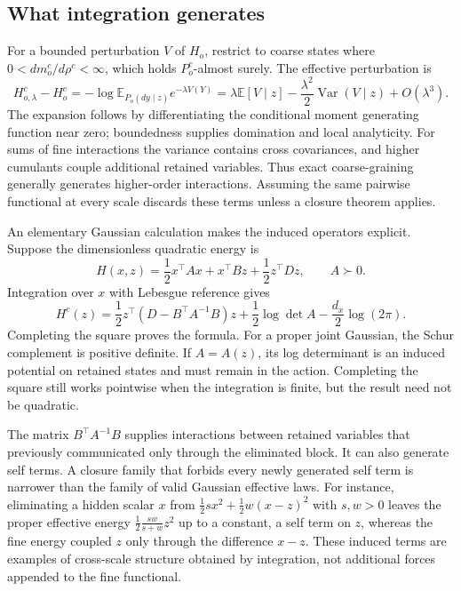 \subsection{What integration generates}
For a bounded perturbation $V$ of $H_o$, restrict to coarse states where $0<dm_o^c/d\rho^c<\infty$, which holds $P_o^c$-almost surely. The effective perturbation is
\begin{equation}
H_{o,\lambda}^c-H_o^c
=-\log\mathbb E_{P_o(dy\mid z)}e^{-\lambda V(Y)}
=\lambda\mathbb E[V\mid z]
-\frac{\lambda^2}{2}\operatorname{Var}(V\mid z)+O(\lambda^3).
\label{eq:conditional_cumulant_action}
\end{equation}
The expansion follows by differentiating the conditional moment generating function near zero; boundedness supplies domination and local analyticity. For sums of fine interactions the variance contains cross covariances, and higher cumulants couple additional retained variables. Thus exact coarse-graining generally generates higher-order interactions. Assuming the same pairwise functional at every scale discards these terms unless a closure theorem applies.

An elementary Gaussian calculation makes the induced operators explicit. Suppose the dimensionless quadratic energy is
\begin{equation}
H(x,z)=\frac12x^\top Ax+x^\top Bz+\frac12z^\top Dz,\qquad A\succ0.
\label{eq:quadratic_elimination}
\end{equation}
Integration over $x$ with Lebesgue reference gives
\begin{equation}
H^c(z)=\frac12z^\top(D-B^\top A^{-1}B)z
+\frac12\log\det A-\frac{d_x}{2}\log(2\pi).
\label{eq:schur_effective_action}
\end{equation}
Completing the square proves the formula. For a proper joint Gaussian, the Schur complement is positive definite. If $A=A(z)$, its log determinant is an induced potential on retained states and must remain in the action. Completing the square still works pointwise when the integration is finite, but the result need not be quadratic.

The matrix $B^\top A^{-1}B$ supplies interactions between retained variables that previously communicated only through the eliminated block. It can also generate self terms. A closure family that forbids every newly generated self term is narrower than the family of valid Gaussian effective laws. For instance, eliminating a hidden scalar $x$ from $\frac12sx^2+\frac12w(x-z)^2$ with $s,w>0$ leaves the proper effective energy $\frac12\frac{sw}{s+w}z^2$ up to a constant, a self term on $z$, whereas the fine energy coupled $z$ only through the difference $x-z$. These induced terms are examples of cross-scale structure obtained by integration, not additional forces appended to the fine functional.

